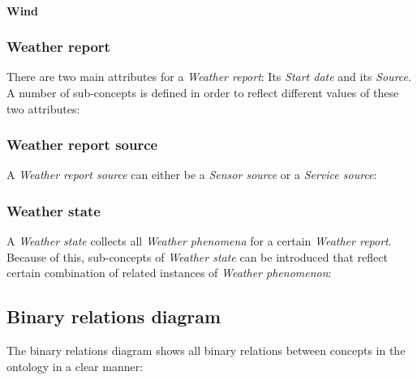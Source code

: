 \paragraph{Wind}

\subsubsection{Weather report}

There are two main attributes for a \emph{Weather report}: Its \emph{Start date} and its \emph{Source}. A number of sub-concepts is defined in order to reflect different values of these two attributes:


\subsubsection{Weather report source}

A \emph{Weather report source} can either be a \emph{Sensor source} or a \emph{Service source}:


\subsubsection{Weather state}

A \emph{Weather state} collects all \emph{Weather phenomena} for a certain \emph{Weather report}. Because of this, sub-concepts of \emph{Weather state} can be introduced that reflect certain combination of related instances of \emph{Weather phenomenon}:


\subsection{Binary relations diagram}
\label{sec:binary_relations_diagram}

The binary relations diagram shows all binary relations between concepts in the ontology in a clear manner:


